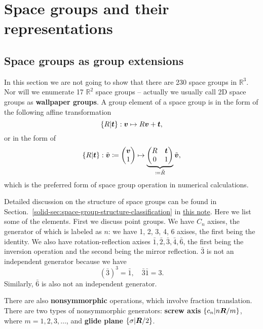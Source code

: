 \documentclass[hyperref, a4paper]{article}
\newcommand*{\concept}[1]{{\textbf{#1}}}
\newcommand{\soliddoc}{\href{../solid/solid.pdf}{this note}}
\begin{document}
\section{Space groups and their representations}

\subsection{Space groups as group extensions}

In this section we are not going to show that there are 230 space groups in $\mathbb{R}^3$. Nor will we 
enumerate 17 $\mathbb{R}^2$ space groups -- actually we usually call 2D space groups as \concept{wallpaper groups}. 
A group element of a space group is in the form of the following affine transformation
\begin{equation}
    \{R| \vb*{t}\} : \vb*{v} \mapsto R \vb*{v} + \vb*{t},
\end{equation}
or in the form of 
\begin{equation}
    \{R | \vb*{t}\} : \tilde{\vb*{v}} \coloneqq \pmqty{\vb*{v} \\ 1} \mapsto \underbrace{\pmqty{R & \vb*{t} \\ 0 & 1 }}_{\coloneqq \tilde{R}} \tilde{\vb*{v}},
\end{equation}
which is the preferred form of space group operation in numerical calculations.

Detailed discussion on the structure of space groups can be found in 
Section.~\ref{solid-sec:space-group-structure-classification} in \soliddoc.
Here we list some of the elements. First we discuss point groups. 
We have $C_n$ axises, the generator of which is labeled as $n$: 
we have 1, 2, 3, 4, 6 axises, the first being the identity. We also have rotation-reflection axises
$\bar{1}, \bar{2}, \bar{3}, \bar{4}, \bar{6}$, the first being the inversion operation and the second 
being the mirror reflection. $\bar{3}$ is not an independent generator because we have 
\[
    (\bar{3})^3 = \bar{1}, \quad \bar{3} \bar{1} = 3.
\]
Similarly, $\bar{6}$ is also not an independent generator.

There are also \concept{nonsymmorphic} operations, which involve fraction translation. There are two 
types of nonsymmorphic generators: \concept{screw axis} $\{c_n | n \vb*{R} / m\}$, where $m = 1, 2, 3, \ldots$,
and \concept{glide plane} $\{\sigma | \vb*{R} / 2\}$.
\end{document}
